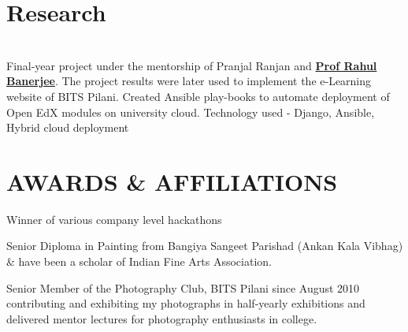 \documentclass[]{deedy-resume-openfont}
\begin{document}
\begin{minipage}[t]{0.66\textwidth}

\section{Research}
\vspace{\topsep}
 \\
Final-year project under the mentorship of Pranjal Ranjan and \textbf{\href{http://www.cs.cornell.edu/~asaxena/}{Prof Rahul Banerjee}}. 
The project results were later used to implement the e-Learning website of BITS Pilani.
Created Ansible play-books to automate deployment of Open EdX modules on university cloud. Technology used - Django, Ansible, Hybrid cloud deployment
\sectionsep



\section{AWARDS \& AFFILIATIONS} 
\begin{tightemize}\vspace{\topsep}
\item Winner of various company level hackathons
\item Senior Diploma in Painting from Bangiya Sangeet Parishad (Ankan Kala Vibhag) \& have been a scholar of Indian Fine Arts Association.
\item Senior Member of the Photography Club, BITS Pilani since August 2010 contributing and exhibiting my photographs in half-yearly exhibitions and delivered mentor lectures for photography enthusiasts in college.
\end{tightemize}
\sectionsep

\end{minipage} 
\end{document}
